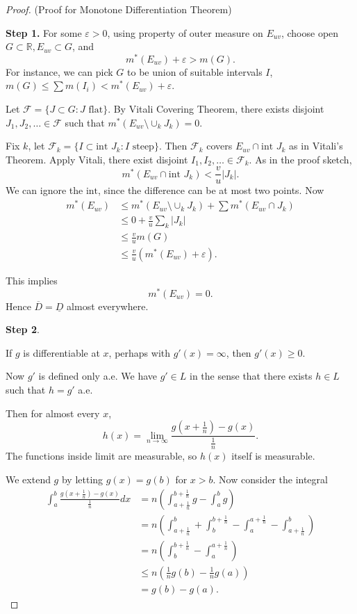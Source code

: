 \begin{proof}(Proof for Monotone Differentiation Theorem)

\textbf{Step 1.}
	For some $\varepsilon>0$, using property of outer measure on $E_{uv}$, choose open $G \subset \mathbb{R}, E_{uv} \subset G$, and
	\[
		m^*(E_{uv}) + \varepsilon > m(G)
	.\] 
	For instance, we can pick $G$ to be union of suitable intervals $I$, $m(G) \le  \sum m(I_i) < m^*(E_{uv}) + \varepsilon$.

	Let $\mathcal{F} = \{J \subset G: J \text{ flat}\} $. By Vitali Covering Theorem, there exists  disjoint $J_1, J_2, \ldots \in \mathcal{F}$ such that $m^*(E_{uv }\setminus \cup _k J_k) = 0$.

	Fix $k$, let $\mathcal{F}_k = \{I \subset \text{int }J_k: I \text{ steep}\} $. Then $\mathcal{F}_k$ covers $E_{uv} \cap  \text{int }J_k $ as in Vitali's Theorem. Apply Vitali, there exist disjoint $I_1, I_2,\ldots \in \mathcal{F}_k$.
	As in the proof sketch,
	\[
		m^*\left( E_{uv } \cap \text{int }J_k \right) < \frac{v}{u} |J_k|
	.\] 
We can ignore the $\text{int}$, since the difference can be at most two points. Now
\begin{align*}
	m^*(E_{uv}) &\le m^*\left(E_{uv } \setminus \cup _k J_k\right) + \sum m^*(E_{uv} \cap J_k)\\
		    &\le 0 + \frac{v}{u} \sum_k |J_k|\\
		    &\le \frac{v}{u} m(G)\\
		    &\le \frac{v}{u} \left(m^*(E_{uv}) + \varepsilon\right) 
.\end{align*} 

This implies
\[
	m^*(E_{uv}) = 0
.\] 
Hence $\overline{D}  = \underline{D}$ almost everywhere.

\textbf{Step 2}.

If $g$ is differentiable at $x$, perhaps with $g'(x) = \infty $, then $g'(x) \ge 0$.

Now $g'$ is defined only a.e. We have $g' \in L$ in the sense that there exists $h \in L$ such that $h = g'$ a.e.

Then for almost every $x$,
\[
	h(x) = \lim_{n \to \infty} \frac{g(x + \frac{1}{n}) - g(x)}{\frac{1}{n}}
.\] 
The functions inside limit are measurable, so $h(x)$ itself is measurable.

We extend $g$ by letting $g(x) = g(b)$ for $x > b$.
Now consider the integral
\begin{align*}
	\int _a^b  \frac{g(x + \frac{1}{n}) - g(x)}{\frac{1}{n}} dx 
	&= n\left( \int _{a+\frac{1}{n}}^{b+\frac{1}{n}} g - \int _a^b g \right) \\
	&= n\left( \int _{a + \frac{1}{n}}^b + \int _b^{b+\frac{1}{n}} - \int _a^{a + \frac{1}{n}} - \int _{a + \frac{1}{n}}^b \right)  \\
	&= n\left( \int _b^{b+\frac{1}{n}} - \int _a^{a + \frac{1}{n}} \right)  \\
	&\le n\left( \frac{1}{n} g(b) - \frac{1}{n}g(a) \right)  \\
	&= g(b) - g(a)
.\end{align*} 


\end{proof}
